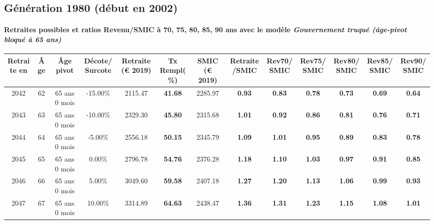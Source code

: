 \newpage 
 
\subsection{Génération 1980 (début en 2002)} 

\paragraph{Retraites possibles et ratios Revenu/SMIC à 70, 75, 80, 85, 90 ans avec le modèle \emph{Gouvernement truqué (âge-pivot bloqué à 65 ans)}}  
 
{ \scriptsize \begin{center} 
\begin{tabular}[htb]{|c|c||c|c||c|c||c||c|c|c|c|c|c|} 
\hline 
 Retraite en &  Âge &  Âge pivot &  Décote/Surcote &  Retraite (\euro{} 2019) &  Tx Rempl(\%) &  SMIC (\euro{} 2019) &  Retraite/SMIC &  Rev70/SMIC &  Rev75/SMIC &  Rev80/SMIC &  Rev85/SMIC &  Rev90/SMIC \\ 
\hline \hline 
 2042 &  62 &  65 ans 0 mois &  -15.00\% &  2115.47 &  {\bf 41.68} &  2285.97 &  {\bf {\color{red} 0.93}} &  {\bf {\color{red} 0.83}} &  {\bf {\color{red} 0.78}} &  {\bf {\color{red} 0.73}} &  {\bf {\color{red} 0.69}} &  {\bf {\color{red} 0.64}} \\ 
\hline 
 2043 &  63 &  65 ans 0 mois &  -10.00\% &  2329.30 &  {\bf 45.80} &  2315.68 &  {\bf 1.01} &  {\bf {\color{red} 0.92}} &  {\bf {\color{red} 0.86}} &  {\bf {\color{red} 0.81}} &  {\bf {\color{red} 0.76}} &  {\bf {\color{red} 0.71}} \\ 
\hline 
 2044 &  64 &  65 ans 0 mois &  -5.00\% &  2556.18 &  {\bf 50.15} &  2345.79 &  {\bf 1.09} &  {\bf 1.01} &  {\bf {\color{red} 0.95}} &  {\bf {\color{red} 0.89}} &  {\bf {\color{red} 0.83}} &  {\bf {\color{red} 0.78}} \\ 
\hline 
 2045 &  65 &  65 ans 0 mois &  0.00\% &  2796.78 &  {\bf 54.76} &  2376.28 &  {\bf 1.18} &  {\bf 1.10} &  {\bf 1.03} &  {\bf {\color{red} 0.97}} &  {\bf {\color{red} 0.91}} &  {\bf {\color{red} 0.85}} \\ 
\hline 
 2046 &  66 &  65 ans 0 mois &  5.00\% &  3049.60 &  {\bf 59.58} &  2407.18 &  {\bf 1.27} &  {\bf 1.20} &  {\bf 1.13} &  {\bf 1.06} &  {\bf {\color{red} 0.99}} &  {\bf {\color{red} 0.93}} \\ 
\hline 
 2047 &  67 &  65 ans 0 mois &  10.00\% &  3314.89 &  {\bf 64.63} &  2438.47 &  {\bf 1.36} &  {\bf 1.31} &  {\bf 1.23} &  {\bf 1.15} &  {\bf 1.08} &  {\bf 1.01} \\ 
\hline 
\hline 
\end{tabular} 
\end{center} } 
